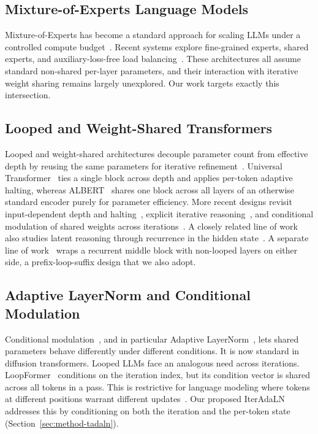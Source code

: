\subsection{Mixture-of-Experts Language Models}
Mixture-of-Experts has become a standard approach for scaling LLMs under a controlled compute budget~\cite{lepikhin2020gshard, fedus2022switch, cai2025survey}. Recent systems explore fine-grained experts, shared experts, and auxiliary-loss-free load balancing~\cite{jiang2024mixtral, xue2024openmoe, liu2024deepseek, yang2025qwen3, zeng2025glm}. These architectures all assume standard non-shared per-layer parameters, and their interaction with iterative weight sharing remains largely unexplored. Our work targets exactly this intersection.


\subsection{Looped and Weight-Shared Transformers}

Looped and weight-shared architectures decouple parameter count from effective depth by reusing the same parameters for iterative refinement~\cite{hutchins2022block}. Universal Transformer~\cite{dehghani2018universal} ties a single block across depth and applies per-token adaptive halting, whereas ALBERT~\cite{lan2019albert} shares one block across all layers of an otherwise standard encoder purely for parameter efficiency. More recent designs revisit input-dependent depth and halting~\cite{bae2025relaxed,bae2026mixture}, explicit iterative reasoning~\cite{mohtashami2025cotformer}, and conditional modulation of shared weights across iterations~\cite{jeddi2026loopformer}. 
A closely related line of work also studies latent reasoning through recurrence in the hidden state~\cite{hao2024training, saunshi2025reasoning}.
A separate line of work~\cite{mcleish2025teaching, zeitoun2026hyperloop, geiping2026scaling} wraps a recurrent middle block with non-looped layers on either side, a prefix-loop-suffix design that we also adopt.

\subsection{Adaptive LayerNorm and Conditional Modulation}
Conditional modulation~\cite{huang2017arbitrary, perez2018film}, and in particular Adaptive LayerNorm~\cite{peebles2023scalable}, lets shared parameters behave differently under different conditions. It is now standard in diffusion transformers. Looped LLMs face an analogous need across iterations. LoopFormer~\cite{jeddi2026loopformer} conditions on the iteration index, but its condition vector is shared across all tokens in a pass. This is restrictive for language modeling where tokens at different positions warrant different updates~\cite{ainslie2023colt5, heakl2025drllm}. Our proposed IterAdaLN addresses this by conditioning on both the iteration and the per-token state (Section~\ref{sec:method-tadaln}).